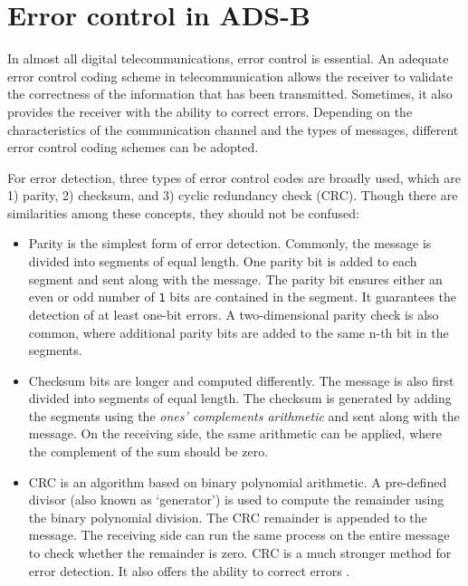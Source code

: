 \chapter{Error control in ADS-B} \label{chap:adsb_parity}

In almost all digital telecommunications, error control is essential. An adequate error control coding scheme in telecommunication allows the receiver to validate the correctness of the information that has been transmitted. Sometimes, it also provides the receiver with the ability to correct errors. Depending on the characteristics of the communication channel and the types of messages, different error control coding schemes can be adopted.

For error detection, three types of error control codes are broadly used, which are 1) parity, 2) checksum, and 3) cyclic redundancy check (CRC)\cite{grami2015}. Though there are similarities among these concepts, they should not be confused:

\begin{itemize}

 \item Parity is the simplest form of error detection. Commonly, the message is divided into segments of equal length. One parity bit is added to each segment and sent along with the message. The parity bit ensures either an even or odd number of \texttt{1} bits are contained in the segment. It guarantees the detection of at least one-bit errors. A two-dimensional parity check is also common, where additional parity bits are added to the same n-th bit in the segments.

 \item Checksum bits are longer and computed differently. The message is also first divided into segments of equal length. The checksum is generated by adding the segments using the \emph{ones' complements arithmetic} and sent along with the message. On the receiving side, the same arithmetic can be applied, where the complement of the sum should be zero.

 \item CRC is an algorithm based on binary polynomial arithmetic. A pre-defined divisor (also known as `generator') is used to compute the remainder using the binary polynomial division. The CRC remainder is appended to the message. The receiving side can run the same process on the entire message to check whether the remainder is zero. CRC is a much stronger method for error detection. It also offers the ability to correct errors \cite{mandel2009}.

\end{itemize}

